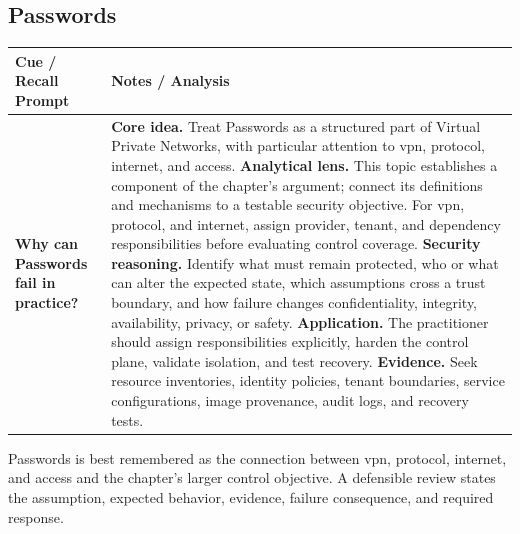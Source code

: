 \documentclass[11pt]{article}
\newcommand{\CornellHeader}{%
\rowcolor{Navy}\color{white}\bfseries Cue / Recall Prompt & \color{white}\bfseries Notes / Analysis\\\hline}
\newcommand{\CornellRow}[2]{%
\cellcolor{CueGray}\RaggedRight\textbf{#1} & \RaggedRight #2\\\hline}
\begin{document}
\subsection*{Passwords}
\begin{longtable}{>{\RaggedRight\arraybackslash}p{}|>{\RaggedRight\arraybackslash}p{}}
\CornellHeader
\CornellRow{Why can Passwords fail in practice?}{\textbf{Core idea.} Treat Passwords as a structured part of Virtual Private Networks, with particular attention to vpn, protocol, internet, and access. \textbf{Analytical lens.} This topic establishes a component of the chapter's argument; connect its definitions and mechanisms to a testable security objective. For vpn, protocol, and internet, assign provider, tenant, and dependency responsibilities before evaluating control coverage. \textbf{Security reasoning.} Identify what must remain protected, who or what can alter the expected state, which assumptions cross a trust boundary, and how failure changes confidentiality, integrity, availability, privacy, or safety. \textbf{Application.} The practitioner should assign responsibilities explicitly, harden the control plane, validate isolation, and test recovery. \textbf{Evidence.} Seek resource inventories, identity policies, tenant boundaries, service configurations, image provenance, audit logs, and recovery tests.}
\end{longtable}
\begin{topicsummary}
Passwords is best remembered as the connection between vpn, protocol, internet, and access and the chapter's larger control objective. A defensible review states the assumption, expected behavior, evidence, failure consequence, and required response.
\end{topicsummary}
\end{document}
